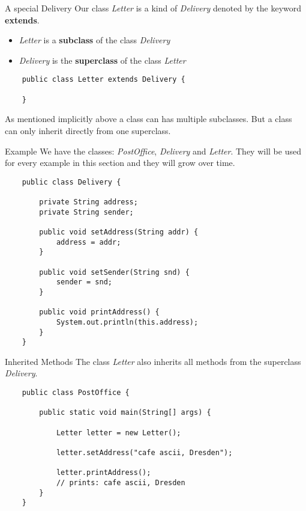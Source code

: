 \begin{frame}[fragile]{A special Delivery}
	Our class \emph{Letter} is a kind of \emph{Delivery} denoted by the keyword \textbf{extends}.
	\begin{itemize}
		\item \emph{Letter} is a \textbf{subclass} of the class \emph{Delivery}
		\item \emph{Delivery} is the \textbf{superclass} of the class \emph{Letter}
	\end{itemize}
	\begin{lstlisting}
	public class Letter extends Delivery {
	
	}
	\end{lstlisting}
	\vfill
	As mentioned implicitly above a class can has multiple subclasses. 
	But a class can only inherit directly from one superclass.
\end{frame}

\begin{frame}[fragile]{Example}
	We have the classes: \emph{PostOffice}, \emph{Delivery} and \emph{Letter}.
	They will be used for every example in this section and they will grow over time.
	\begin{lstlisting}
	public class Delivery {
	
	    private String address;
	    private String sender;
	    
	    public void setAddress(String addr) {
			address = addr;
	    }
	    
	    public void setSender(String snd) {
			sender = snd;
	    }
	    
	    public void printAddress() {
	        System.out.println(this.address);
	    }
	}
	\end{lstlisting}
\end{frame}

\begin{frame}[fragile]{Inherited Methods}
	The class \emph{Letter} also inherits all methods from the superclass \emph{Delivery}.
	\begin{lstlisting}
	public class PostOffice {
	
	    public static void main(String[] args) {
	    
	        Letter letter = new Letter();
	        
	        letter.setAddress("cafe ascii, Dresden");
	        
	        letter.printAddress();
	        // prints: cafe ascii, Dresden
	    }	
	}
	\end{lstlisting}
\end{frame}

